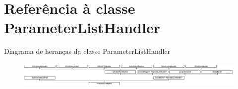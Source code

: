 \hypertarget{class_parameter_list_handler}{\section{Referência à classe Parameter\-List\-Handler}
\label{class_parameter_list_handler}
}
Diagrama de heranças da classe Parameter\-List\-Handler\begin{figure}[H]
\begin{center}
\leavevmode
\includegraphics[height=1.259843cm]{class_parameter_list_handler}
\end{center}
\end{figure}
